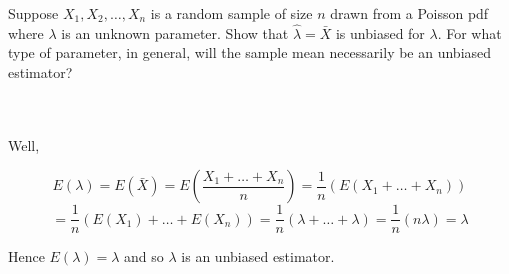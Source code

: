 Suppose $X_1, X_2,\ldots, X_n$ is a random sample of size $n$ drawn from a Poisson pdf where $\lambda$
is an unknown parameter. Show that $\hat{\lambda}=\bar{X}$ is unbiased for $\lambda$. For what type of
parameter, in general, will the sample mean necessarily be an unbiased estimator?\\\\

\begin{solution}\renewcommand{\qedsymbol}{}\ \\
    Well,
    
    $$E(\lambda)=E(\bar{X})=E(\frac{X_1+\ldots+X_n}{n})=\frac1n(E(X_1+\ldots+X_n))$$
    $$=\frac1n(E(X_1)+\ldots+E(X_n))=\frac1n(\lambda+\ldots+\lambda)=\frac1n(n\lambda)=\lambda$$
    
    Hence $E(\lambda)=\lambda$ and so $\lambda$ is an unbiased estimator.

\end{solution}
